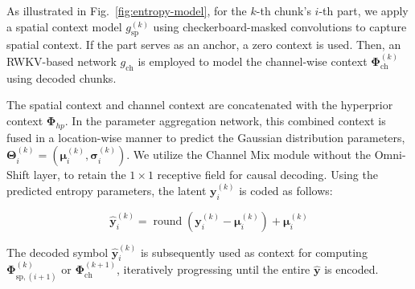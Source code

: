 As illustrated in Fig.~\ref{fig:entropy-model}, for the \(k\)-th chunk’s \(i\)-th part, we apply a spatial context model \( g_{\mathrm{sp}}^{(k)} \) using checkerboard-masked convolutions to capture spatial context. If the part serves as an anchor, a zero context is used. Then, an RWKV-based network \( g_{\mathrm{ch}} \) is employed to model the channel-wise context \( \boldsymbol{\Phi}_{\mathrm{ch}}^{(k)} \) using decoded chunks. 

The spatial context and channel context are concatenated with the hyperprior context \( \boldsymbol{\Phi}_{hp} \). In the parameter aggregation network, this combined context is fused in a location-wise manner to predict the Gaussian distribution parameters, \( \boldsymbol{\Theta}_i^{(k)} = (\boldsymbol{\mu}_i^{(k)}, \boldsymbol{\sigma}_i^{(k)} ) \). We utilize the Channel Mix module without the Omni-Shift layer, to retain the $1 \times 1$ receptive field for causal decoding. Using the predicted entropy parameters, the latent \( {\boldsymbol{y}}_i^{(k)} \) is coded as follows:

\begin{equation}
    \hat{\boldsymbol{y}}_i^{(k)} = \operatorname{round}( {\boldsymbol{y}}_i^{(k)} - \boldsymbol{\mu}_i^{(k)}) + \boldsymbol{\mu}_i^{(k)}
\end{equation}

The decoded symbol \( \hat{\boldsymbol{y}}_i^{(k)} \) is subsequently used as context for computing \( \boldsymbol{\Phi}_{\mathrm{sp},(i+1)}^{(k)} \) or \( \boldsymbol{\Phi}_{\mathrm{ch}}^{(k+1)} \), iteratively progressing until the entire \( \hat{\boldsymbol{y}} \) is encoded.

